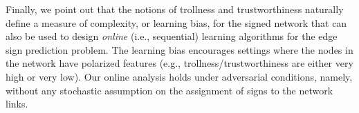 Finally, we point out that the notions of trollness and trustworthiness naturally define a measure
of complexity, or learning bias, for the signed network that can also be used to design
\emph{online} (i.e., sequential) learning algorithms for the edge sign prediction problem. The
learning bias encourages settings where the nodes in the network have polarized features (e.g.,
trollness/trustworthiness are either very high or very low). Our online analysis holds under
adversarial conditions, namely, without any stochastic assumption on the assignment of signs to the
network links.


